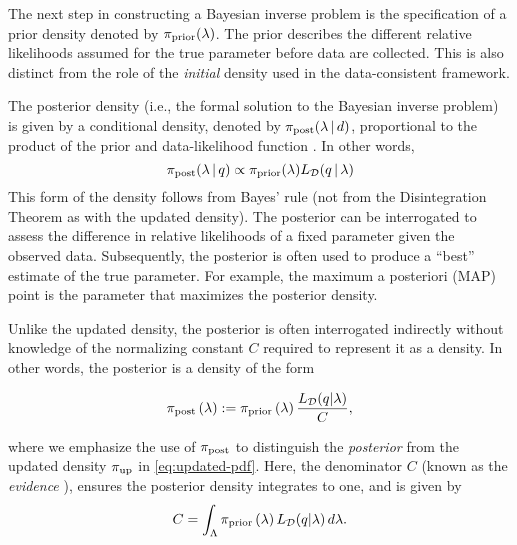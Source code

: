 The next step in constructing a Bayesian inverse problem is the specification of a prior density denoted by $\pi_\text{prior}(\lambda)$.
The prior describes the different relative likelihoods assumed for the true parameter before data are collected.
This is also distinct from the role of the {\em initial} density used in the data-consistent framework.

The posterior density (i.e., the formal solution to the Bayesian inverse problem) is given by a conditional density, denoted by $\pi_\text{post}(\lambda\, | \, d)$, proportional to the product of the prior and data-likelihood function \citep{Walpole, Berger, Complete, Smith}.
In other words,
\begin{equation*}
	\operatorname*{\pi_{post}}(\lambda\, | \, q) \propto \operatorname*{\pi_{prior}}(\lambda)L_{\mathcal{D}}(q\, | \, \lambda)
\end{equation*}
This form of the density follows from Bayes' rule (not from the Disintegration Theorem as with the updated density).
The posterior can be interrogated to assess the difference in relative likelihoods of a fixed parameter given the observed data.
Subsequently, the posterior is often used to produce a ``best'' estimate of the true parameter.
For example, the maximum a posteriori (MAP) point is the parameter that maximizes the posterior density.

Unlike the updated density, the posterior is often interrogated indirectly without knowledge of the normalizing constant $C$ required to represent it as a density.
In other words, the posterior is a density of the form

\begin{equation}\label{eq:sb_post}
    \operatorname*{\pi_{post}}\left ( \lambda \right ) := \operatorname*{\pi_{prior}}\left ( \lambda \right ) \frac{L_{\mathcal{D}} (q | \lambda)}{ C },
\end{equation}

\noindent where we emphasize the use of $\operatorname*{\pi_{post}}$ to distinguish the \emph{posterior} from the updated density $\operatorname*{\pi_{up}}$ in \eqref{eq:updated-pdf}.
Here, the denominator $C$ (known as the \emph{evidence} \cite{Smith}), ensures the posterior density integrates to one, and is given by
\[
C = \int_{\Lambda} \operatorname*{\pi_{prior}}\left ( \lambda \right ) L_{\mathcal{D}}(q | \lambda) \, d\lambda.
\]

